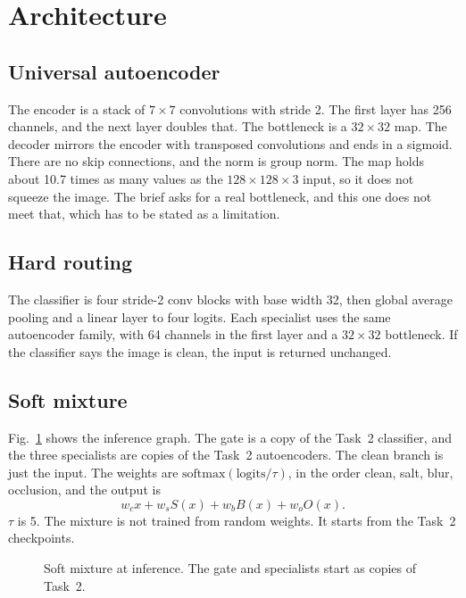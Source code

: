 \documentclass[conference]{IEEEtran}
\begin{document}
\section{Architecture}
\subsection{Universal autoencoder}
The encoder is a stack of $7\times7$ convolutions with stride 2. The first layer has 256 channels, and the next layer doubles that. The bottleneck is a $32\times32$ map. The decoder mirrors the encoder with transposed convolutions and ends in a sigmoid. There are no skip connections, and the norm is group norm. The map holds about 10.7 times as many values as the $128\times128\times3$ input, so it does not squeeze the image. The brief asks for a real bottleneck, and this one does not meet that, which has to be stated as a limitation.

\subsection{Hard routing}
The classifier is four stride-2 conv blocks with base width 32, then global average pooling and a linear layer to four logits. Each specialist uses the same autoencoder family, with 64 channels in the first layer and a $32\times32$ bottleneck. If the classifier says the image is clean, the input is returned unchanged.

\subsection{Soft mixture}
Fig.~\ref{fig:mix} shows the inference graph. The gate is a copy of the Task~2 classifier, and the three specialists are copies of the Task~2 autoencoders. The clean branch is just the input. The weights are $\mathrm{softmax}(\mathrm{logits}/\tau)$, in the order clean, salt, blur, occlusion, and the output is
\begin{equation}
w_c x + w_s S(x) + w_b B(x) + w_o O(x).
\end{equation}
$\tau$ is 5. The mixture is not trained from random weights. It starts from the Task~2 checkpoints.

\begin{figure}[t]
\centering
{}
\caption{Soft mixture at inference. The gate and specialists start as copies of Task~2.}
\label{fig:mix}
\end{figure}
\end{document}
